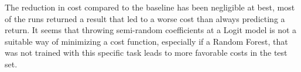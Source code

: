 The reduction in cost compared to the baseline has been negligible at best, most of the runs returned a result that led to a worse cost than always predicting a return. It seems that throwing semi-random coefficients at a Logit model is not a suitable way of minimizing a cost function, especially if a Random Forest, that was not trained with this specific task leads to more favorable costs in the test set. 